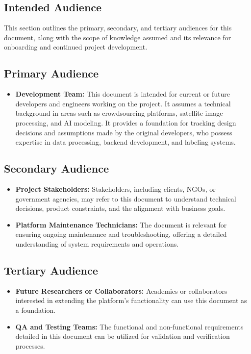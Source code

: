 \documentclass[12pt]{article}
\begin{document}
\subsection{Intended Audience}

This section outlines the primary, secondary, and tertiary audiences for this document, along with the scope of knowledge assumed and its relevance for onboarding and continued project development.

\subsection{Primary Audience}
\begin{itemize}
    \item \textbf{Development Team:} This document is intended for current or future developers and engineers working on the project. It assumes a technical background in areas such as crowdsourcing platforms, satellite image processing, and AI modeling. It provides a foundation for tracking design decisions and assumptions made by the original developers, who possess expertise in data processing, backend development, and labeling systems.
\end{itemize}

\subsection{Secondary Audience}
\begin{itemize}
    \item \textbf{Project Stakeholders:} Stakeholders, including clients, NGOs, or government agencies, may refer to this document to understand technical decisions, product constraints, and the alignment with business goals.
    \item \textbf{Platform Maintenance Technicians:} The document is relevant for ensuring ongoing maintenance and troubleshooting, offering a detailed understanding of system requirements and operations.
\end{itemize}

\subsection{Tertiary Audience}
\begin{itemize}
    \item \textbf{Future Researchers or Collaborators:} Academics or collaborators interested in extending the platform’s functionality can use this document as a foundation.
    \item \textbf{QA and Testing Teams:} The functional and non-functional requirements detailed in this document can be utilized for validation and verification processes.
\end{itemize}
\end{document}
